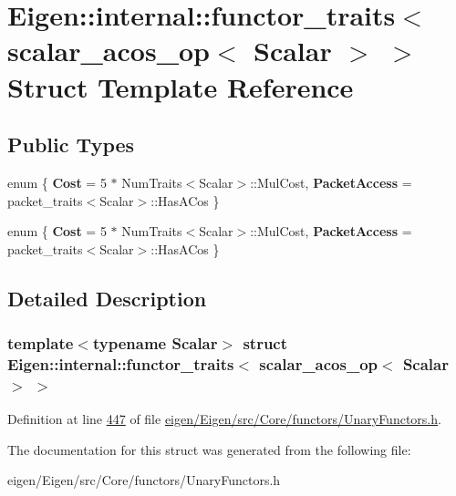 \hypertarget{struct_eigen_1_1internal_1_1functor__traits_3_01scalar__acos__op_3_01_scalar_01_4_01_4}{}\section{Eigen\+:\+:internal\+:\+:functor\+\_\+traits$<$ scalar\+\_\+acos\+\_\+op$<$ Scalar $>$ $>$ Struct Template Reference}
\label{struct_eigen_1_1internal_1_1functor__traits_3_01scalar__acos__op_3_01_scalar_01_4_01_4}
\subsection*{Public Types}
\begin{DoxyCompactItemize}
\item 
\mbox{\label{struct_eigen_1_1internal_1_1functor__traits_3_01scalar__acos__op_3_01_scalar_01_4_01_4_aacef23942095022c6a60894fe259ee97}} 
enum \{ {\bfseries Cost} = 5 $\ast$ Num\+Traits$<$Scalar$>$\+:\+:Mul\+Cost, 
{\bfseries Packet\+Access} = packet\+\_\+traits$<$Scalar$>$\+:\+:Has\+A\+Cos
 \}
\item 
\mbox{\label{struct_eigen_1_1internal_1_1functor__traits_3_01scalar__acos__op_3_01_scalar_01_4_01_4_a051e2536e674227130077e8239219be0}} 
enum \{ {\bfseries Cost} = 5 $\ast$ Num\+Traits$<$Scalar$>$\+:\+:Mul\+Cost, 
{\bfseries Packet\+Access} = packet\+\_\+traits$<$Scalar$>$\+:\+:Has\+A\+Cos
 \}
\end{DoxyCompactItemize}


\subsection{Detailed Description}
\subsubsection*{template$<$typename Scalar$>$\newline
struct Eigen\+::internal\+::functor\+\_\+traits$<$ scalar\+\_\+acos\+\_\+op$<$ Scalar $>$ $>$}



Definition at line \hyperlink{eigen_2_eigen_2src_2_core_2functors_2_unary_functors_8h_source_l00447}{447} of file \hyperlink{eigen_2_eigen_2src_2_core_2functors_2_unary_functors_8h_source}{eigen/\+Eigen/src/\+Core/functors/\+Unary\+Functors.\+h}.



The documentation for this struct was generated from the following file\+:\begin{DoxyCompactItemize}
\item 
eigen/\+Eigen/src/\+Core/functors/\+Unary\+Functors.\+h\end{DoxyCompactItemize}
